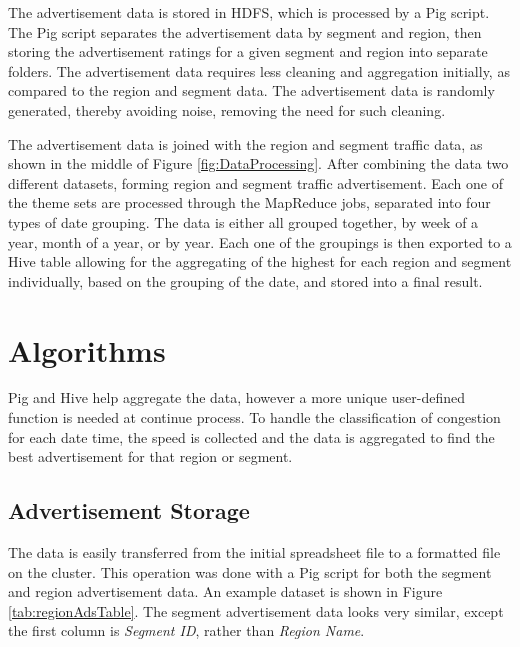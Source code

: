 \documentclass[titlepage,twocolumn]{article}
\begin{document}
\par The advertisement data is stored in HDFS, which is processed by a Pig script. The Pig script separates the advertisement data by segment and region, then storing the advertisement ratings for a given segment and region into separate folders. The advertisement data requires less cleaning and aggregation initially, as compared to the region and segment data. The advertisement data is randomly generated, thereby avoiding noise, removing the need for such cleaning. 

\par The advertisement data is joined with the region and segment traffic data, as shown in the middle of Figure \ref{fig:DataProcessing}. After combining the data two different datasets, forming region and segment traffic advertisement. Each one of the theme sets are processed through the MapReduce jobs, separated into four types of date grouping. The data is either all grouped together, by week of a year, month of a year, or by year. Each one of the groupings is then exported to a Hive table allowing for the aggregating of the highest for each region and segment individually, based on the grouping of the date, and stored into a final result. 

\section{Algorithms}
\label{sec:algorithms}

\par Pig and Hive help aggregate the data, however a more unique user-defined function is needed at continue process. To handle the classification of congestion for each date time, the speed is collected and the data is aggregated to find the best advertisement for that region or segment.

\subsection{Advertisement Storage}

\par The data is easily transferred from the initial spreadsheet file to a formatted file on the cluster. This operation was done with a Pig script for both the segment and region advertisement data. An example dataset is shown in Figure \ref{tab:regionAdsTable}. The segment advertisement data looks very similar, except the first column is \textit{Segment ID}, rather than \textit{Region Name}. 
\end{document}
